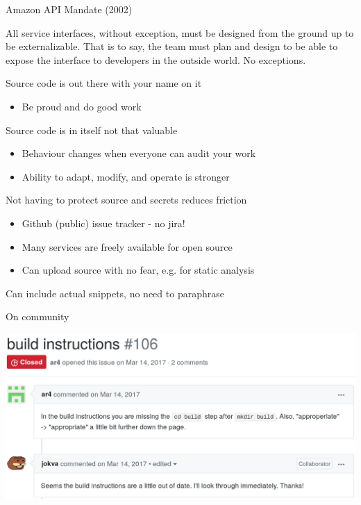 \documentclass[pdf]{beamer}
\begin{document}
\begin{frame}
    Amazon API Mandate (2002)

    \begin{displayquote}
        All service interfaces, without exception, must be designed from the
        ground up to be externalizable. That is to say, the team must plan and
        design to be able to expose the interface to developers in the outside
        world. No exceptions.
    \end{displayquote}
\end{frame}

\begin{frame}
    Source code is out there with your name on it
    \begin{itemize}
        \item Be proud and do good work
    \end{itemize}
\end{frame}

\begin{frame}
    Source code is in itself not that valuable
    \begin{itemize}
        \item Behaviour changes when everyone can audit your work
        \item Ability to adapt, modify, and operate is stronger
    \end{itemize}
\end{frame}

\begin{frame}
    Not having to protect source and secrets reduces friction
    \begin{itemize}
        \item Github (public) issue tracker - no jira!
        \item Many services are freely available for open source
        \item Can upload source with no fear, e.g. for static analysis
    \end{itemize}
    Can include actual snippets, no need to paraphrase
\end{frame}

\begin{frame}
    \begin{center}
        On community
    \end{center}
\end{frame}

\begin{frame}
    \includegraphics[width=\textwidth, keepaspectratio]{img/segyio-first-issue}
\end{frame}
\end{document}
